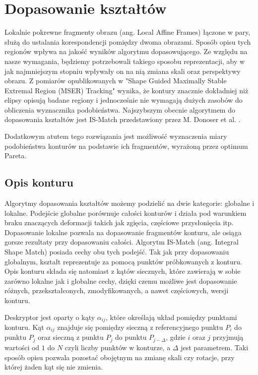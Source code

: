 \chapter{Dopasowanie kształtów}

Lokalnie pokrewne fragmenty obrazu (ang. Local Affine Frames) łączone w pary,
służą do ustalania korespondencji pomiędzy dwoma obrazami. Sposób opisu tych
regionów wpływa na jakość wyników algorytmu dopasowującego. Ze względu na nasze
wymagania, będziemy potrzebowali takiego sposobu reprezentacji, aby w jak
najmniejszym stopniu wpływały on na nią zmiana skali oraz perspektywy obrazu. Z
pomiarów opublikowanych w "Shape Guided Maximally Stable Extremal
Region (MSER) Tracking" \cite{mser_tracking} wynika, że kontury znacznie
dokładniej niż elipsy opisują badane regiony i jednocześnie nie wymagają dużych
zasobów do obliczenia wyznacznika podobieństwa. Najszybszym obecnie algorytmem
do dopasowania kształtów jest IS-Match przedstawiony przez M. Donoser et al.
\cite{ismatch}.

Dodatkowym atutem tego rozwiązania jest możliwość wyznaczenia miary
podobieństwa konturów na podstawie ich fragmentów, wyrażoną przez optimum
Pareta.

\section{Opis konturu}

Algorytmy dopasowania kształtów możemy podzielić na dwie kategorie: globalne i
lokalne. Podejście globalne porównuje całości konturów i działa pod warunkiem
braku znaczących deformacji takich jak zgięcia, częściowe przysłonięcia itp.
Dopasowanie lokalne pozwala na dopasowanie fragmentów konturu, ale osiąga
gorsze rezultaty przy dopasowaniu całości. Algorytm IS-Match (ang. Integral
Shape Match) posiada cechy obu tych podejść. Tak jak przy dopasowaniu
globalnym, kształt reprezentuje za pomocą punktów próbkowanych z konturu. Opis
konturu składa się natomiast z kątów siecznych, które zawierają w sobie zarówno
lokalne jak i globalne cechy, dzięki czemu możliwe jest dopasowanie różnych,
przekształconych, zmodyfikowanych, a nawet częściowych, wersji konturu.

Deskryptor jest oparty o kąty $\alpha_{ij}$, które określają układ pomiędzy
punktami konturu. Kąt $\alpha_{ij}$ znajduje się pomiędzy sieczną z
referencyjnego punktu $P_{i}$ do punktu $P_{j}$ oraz sieczną z punktu $P_{j}$
do punktu $P_{j-\Delta}$, gdzie $i$ oraz $j$ przyjmują wartości od $1$ do $N$
czyli liczby punktów w konturze, a $\Delta$ jest parametrem. Taki sposób opisu
pozwala pozostać obojętnym na zmianę skali czy rotacje, przy której żaden kąt
się nie zmienia.

